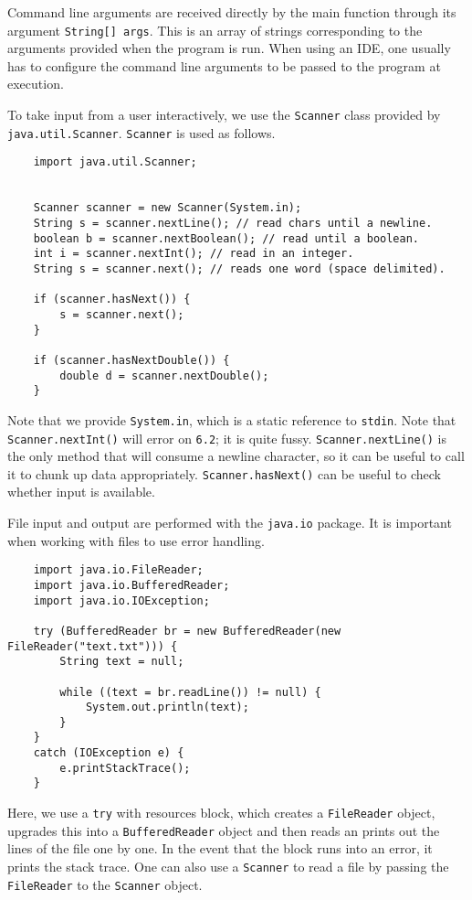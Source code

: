 \documentclass[12pt]{report}
\newcommand{\code}[1]{\lstinline{#1}}
\begin{document}
\begin{flushleft}
Command line arguments are received directly by the main function through its
argument \code{String[] args}. This is an array of strings corresponding to the
arguments provided when the program is run. When using an IDE, one usually has
to configure the command line arguments to be passed to the program at 
execution. \par
To take input from a user interactively, we use the \code{Scanner} class 
provided by \code{java.util.Scanner}. \code{Scanner} is used as follows.

\begin{lstlisting}
    import java.util.Scanner;


    Scanner scanner = new Scanner(System.in);
    String s = scanner.nextLine(); // read chars until a newline.
    boolean b = scanner.nextBoolean(); // read until a boolean.
    int i = scanner.nextInt(); // read in an integer.
    String s = scanner.next(); // reads one word (space delimited).

    if (scanner.hasNext()) {
        s = scanner.next();
    }

    if (scanner.hasNextDouble()) {
        double d = scanner.nextDouble();
    }
\end{lstlisting}

Note that we provide \code{System.in}, which is a static reference to
\code{stdin}. Note that \code{Scanner.nextInt()} will error on \code{6.2}; it
is quite fussy. \code{Scanner.nextLine()} is the only method that will consume
a newline character, so it can be useful to call it to chunk up data
appropriately. \code{Scanner.hasNext()} can be useful to check whether input is
available. \par
File input and output are performed with the \code{java.io} package. It is
important when working with files to use error handling.

\begin{lstlisting}
    import java.io.FileReader;
    import java.io.BufferedReader;
    import java.io.IOException;

    try (BufferedReader br = new BufferedReader(new FileReader("text.txt"))) {
        String text = null;

        while ((text = br.readLine()) != null) {
            System.out.println(text);
        }
    }
    catch (IOException e) {
        e.printStackTrace();
    }
\end{lstlisting}

Here, we use a \code{try} with resources block, which creates a
\code{FileReader} object, upgrades this into a \code{BufferedReader} object and
then reads an prints out the lines of the file one by one. In the event that
the block runs into an error, it prints the stack trace. One can also use a
\code{Scanner} to read a file by passing the \code{FileReader} to the 
\code{Scanner} object.


\end{flushleft}
\end{document}
